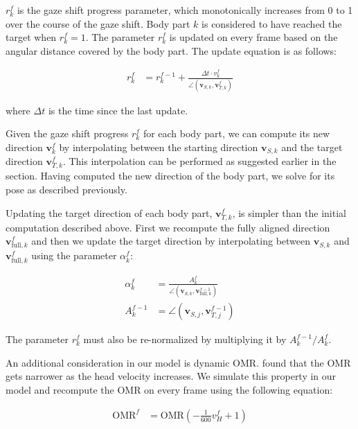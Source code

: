 $r^f_k$ is the gaze shift progress parameter, which monotonically increases from 0 to 1 over the course of the gaze shift. Body part $k$ is considered to have reached the target when $r^f_k = 1$. The parameter $r^f_k$ is updated on every frame based on the angular distance covered by the body part. The update equation is as follows:

\begin{align} \label{eq:RotProgressUpdate}
r^f_k &= r^{f-1}_k + \frac{\Delta t \cdot v^f_k}{\angle(\mathbf{v}_{S,k}, \mathbf{v}^f_{T,k})}
\end{align}

where $\Delta t$ is the time since the last update.

Given the gaze shift progress $r^f_k$ for each body part, we can compute its new direction $\mathbf{v}^f_k$ by interpolating between the starting direction $\mathbf{v}_{S,k}$ and the target direction $\mathbf{v}^f_{T,k}$. This interpolation can be performed as suggested earlier in the section. Having computed the new direction of the body part, we solve for its pose as described previously.

Updating the target direction of each body part, $\mathbf{v}^f_{T,k}$, is simpler than the initial computation described above. First we recompute the fully aligned direction $\mathbf{v}^f_{\mathrm{full},k}$ and then we update the target direction by interpolating between $\mathbf{v}_{S,k}$ and $\mathbf{v}^f_{\mathrm{full},k}$ using the parameter $\alpha^f_k$:

\begin{align}
\label{eq:TargetRotUpdate}
\alpha^f_k &= \frac{A^f_k}{\angle(\mathbf{v}_{S,k}, \mathbf{v}^{f-1}_{\mathrm{full},k})} \\
A^{f-1}_k &= \angle(\mathbf{v}_{S,j}, \mathbf{v}^{f-1}_{T,j}) \nonumber
\end{align}

The parameter $r^f_k$ must also be re-normalized by multiplying it by $A^{f-1}_k / A^f_k$.

An additional consideration in our model is dynamic OMR. \citet{guitton1987gaze} found that the OMR gets narrower as the head velocity increases. We simulate this property in our model and recompute the OMR on every frame using the following equation:

\begin{align} \label{eq:OMRUpdate}
\mathrm{OMR}^f &= \mathrm{OMR} (-\frac{1}{600} v^f_H + 1)
\end{align}

